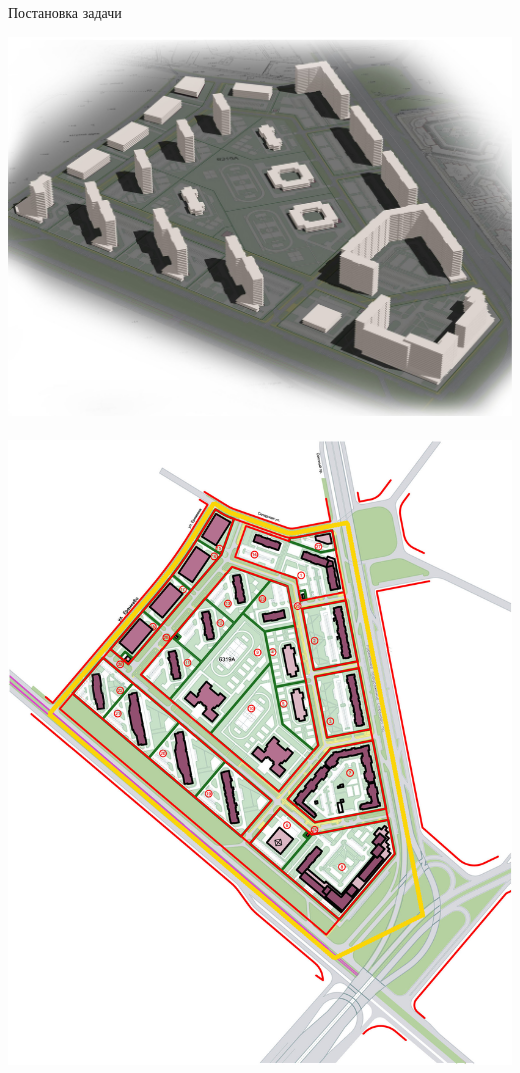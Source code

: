 \documentclass[14pt, fleqn, xcolor={dvipsnames, table}]{beamer}
\begin{document}
        \begin{frame}{Постановка задачи}
            \begin{center}
                \includegraphics[scale=0.08]{3d.jpg}~
                \includegraphics[scale=0.28]{fill.jpg}
            \end{center}                 
        \end{frame}
        
\end{document}
